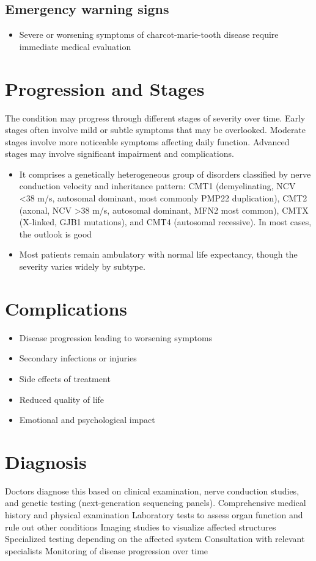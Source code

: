 \subsection{Emergency warning signs}
\begin{itemize}[noitemsep]
  \item Severe or worsening symptoms of charcot-marie-tooth disease require immediate medical evaluation
\end{itemize}
\section{Progression and Stages}
The condition may progress through different stages of severity over time. Early stages often involve mild or subtle symptoms that may be overlooked. Moderate stages involve more noticeable symptoms affecting daily function. Advanced stages may involve significant impairment and complications.

\begin{itemize}[noitemsep]
  \item It comprises a genetically heterogeneous group of disorders classified by nerve conduction velocity and inheritance pattern: CMT1 (demyelinating, NCV <38 m/s, autosomal dominant, most commonly PMP22 duplication), CMT2 (axonal, NCV >38 m/s, autosomal dominant, MFN2 most common), CMTX (X-linked, GJB1 mutations), and CMT4 (autosomal recessive). In most cases, the outlook is good
  \item Most patients remain ambulatory with normal life expectancy, though the severity varies widely by subtype.
\end{itemize}
\section{Complications}
\begin{itemize}[noitemsep]
  \item Disease progression leading to worsening symptoms
  \item Secondary infections or injuries
  \item Side effects of treatment
  \item Reduced quality of life
  \item Emotional and psychological impact
\end{itemize}
\section{Diagnosis}
Doctors diagnose this based on clinical examination, nerve conduction studies, and genetic testing (next-generation sequencing panels). Comprehensive medical history and physical examination Laboratory tests to assess organ function and rule out other conditions Imaging studies to visualize affected structures Specialized testing depending on the affected system Consultation with relevant specialists Monitoring of disease progression over time

